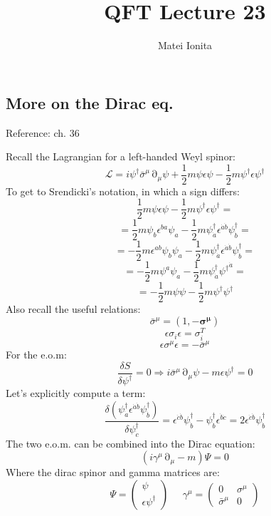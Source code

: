 \documentclass[12 pt]{article}
\title{QFT Lecture 23}
\author{Matei Ionita}
\DeclareMathOperator {\p} {\partial}
\begin{document}
  \maketitle

\subsection*{More on the Dirac eq.}
Reference: ch. 36

Recall the Lagrangian for a left-handed Weyl spinor:
\[      \mathcal{L} = i \psi^{\dagger} \bar \sigma^{\mu} \p_{\mu} \psi + \frac{1}{2} m \psi \epsilon \psi - \frac{1}{2} m \psi^{\dagger} \epsilon \psi^{\dagger}      \]
To get to Srendicki's notation, in which a sign differs:
\[      \frac{1}{2} m \psi \epsilon \psi - \frac{1}{2} m \psi^{\dagger} \epsilon \psi^{\dagger}    = \]
\[ = \frac{1}{2} m \psi_b \epsilon^{ba} \psi_a - \frac{1}{2} m \psi^{\dagger}_{\dot a} \epsilon^{\dot a \dot b} \psi^{\dagger}_{\dot b}    =         \]
\[ =  - \frac{1}{2} m \epsilon^{ab} \psi_b  \psi_a - \frac{1}{2} m \psi^{\dagger}_{\dot a} \epsilon^{\dot a \dot b} \psi^{\dagger}_{\dot b}    =    \]
\[ =  - \frac{1}{2} m  \psi^a  \psi_a - \frac{1}{2} m \psi^{\dagger}_{\dot a}  {\psi^{\dagger}}^{\dot a}    =    \]
\[ =  - \frac{1}{2} m  \psi  \psi - \frac{1}{2} m \psi^{\dagger}  \psi^{\dagger}       \]
Also recall the useful relations:
\[     \bar \sigma^{\mu} = (1, - \mathbf{\sigma^{\mu}} )    \]
\[       \epsilon \sigma_i \epsilon = \sigma_i^T     \]
\[       \epsilon \sigma^{\mu} \epsilon = - \bar \sigma^{\mu}            \]
For the e.o.m:
\[    \frac{\delta S}{\delta \psi^{\dagger}} = 0 \Rightarrow i\bar\sigma^{\mu} \p_{\mu} \psi - m \epsilon \psi^{\dagger} = 0     \]
Let's explicitly compute a term:
\[     \frac{\delta (\psi^{\dagger}_{\dot a} \epsilon^{\dot a \dot b} \psi^{\dagger}_{\dot b})}{\delta \psi^{\dagger}_{\dot c}}   = \epsilon^{\dot c \dot b} \psi^{\dagger}_{\dot b} - \psi^{\dagger}_{\dot b} \epsilon^{\dot b \dot c} = 2 \epsilon^{\dot c \dot b} \psi^{\dagger}_{\dot b}   \]
The two e.o.m. can be combined into the Dirac equation:
\[       (i\gamma^{\mu}\p_{\mu} - m)  \Psi = 0      \]
Where the dirac spinor and gamma matrices are:
\[      \Psi = \left(  \begin{array} {c} \psi \\ \epsilon \psi^{\dagger} \end{array}  \right)  \;\;\;\;\; \gamma^{\mu} = \left( \begin{array} {cc}  0 & \sigma^{\mu} \\ \bar \sigma^{\mu} & 0  \end{array} \right)    \]
\end{document}
